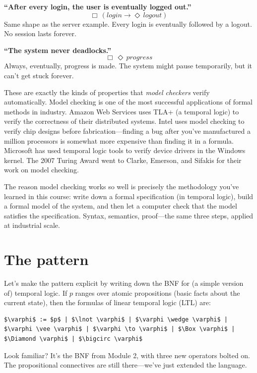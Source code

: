 \documentclass[11pt]{article}
\begin{document}
\medskip
\noindent\textbf{``After every login, the user is eventually logged out.''}
\[
\Box\,(\mathit{login} \to \Diamond\, \mathit{logout})
\]
Same shape as the server example. Every login is eventually followed by a logout. No session lasts forever.

\medskip
\noindent\textbf{``The system never deadlocks.''}
\[
\Box\, \Diamond\, \mathit{progress}
\]
Always, eventually, progress is made. The system might pause temporarily, but it can't get stuck forever.

\medskip
These are exactly the kinds of properties that \emph{model checkers} verify automatically. Model checking is one of the most successful applications of formal methods in industry. Amazon Web Services uses TLA+ (a temporal logic) to verify the correctness of their distributed systems. Intel uses model checking to verify chip designs before fabrication---finding a bug after you've manufactured a million processors is somewhat more expensive than finding it in a formula. Microsoft has used temporal logic tools to verify device drivers in the Windows kernel. The 2007 Turing Award went to Clarke, Emerson, and Sifakis for their work on model checking.

The reason model checking works so well is precisely the methodology you've learned in this course: write down a formal specification (in temporal logic), build a formal model of the system, and then let a computer check that the model satisfies the specification. Syntax, semantics, proof---the same three steps, applied at industrial scale.

\section{The pattern}

Let's make the pattern explicit by writing down the BNF for (a simple version of) temporal logic. If $p$ ranges over atomic propositions (basic facts about the current state), then the formulas of linear temporal logic (LTL) are:

\begin{lstlisting}
$\varphi$ := $p$ | $\lnot \varphi$ | $\varphi \wedge \varphi$ | $\varphi \vee \varphi$ | $\varphi \to \varphi$ | $\Box \varphi$ | $\Diamond \varphi$ | $\bigcirc \varphi$
\end{lstlisting}

Look familiar? It's the BNF from Module 2, with three new operators bolted on. The propositional connectives are still there---we've just extended the language.
\end{document}

